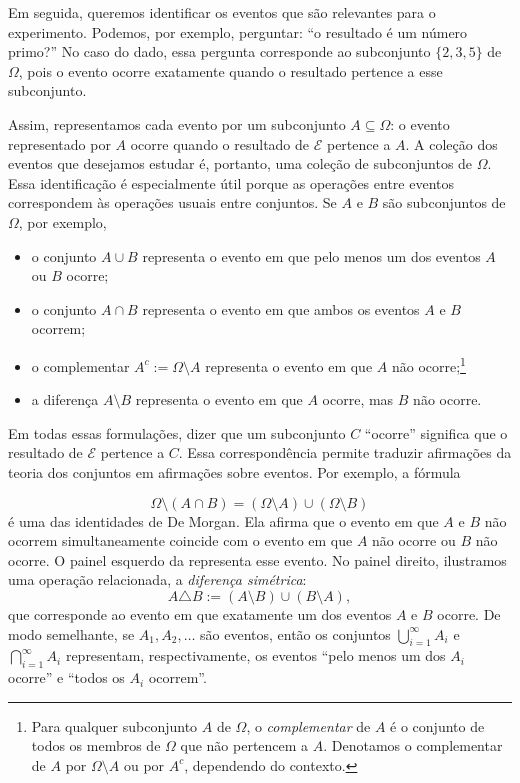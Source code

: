 \documentclass[12pt,portuguese]{article}
\theoremstyle{definition}
\begin{document}
\medskip

Em seguida, queremos identificar os eventos que são relevantes para o
experimento. Podemos, por exemplo, perguntar: ``o resultado é um número
primo?'' No caso do dado, essa pergunta corresponde ao subconjunto
\(\{2, 3, 5\}\) de \(\Omega\), pois o evento ocorre exatamente quando o
resultado pertence a esse subconjunto.

Assim, representamos cada evento por um subconjunto \(A \subseteq \Omega\): o
evento representado por \(A\) ocorre quando o resultado de \(\mathcal{E}\)
pertence a \(A\). A coleção dos eventos que desejamos estudar é, portanto,
uma coleção de subconjuntos de \(\Omega\). Essa identificação é especialmente
útil porque as operações entre eventos correspondem às operações usuais entre
conjuntos. Se \(A\) e \(B\) são subconjuntos de \(\Omega\), por exemplo,
\begin{itemize}
\item o conjunto \(A \cup B\) representa o evento em que pelo menos um dos
eventos \(A\) ou \(B\) ocorre;
\item o conjunto \(A \cap B\) representa o evento em que ambos os eventos
\(A\) e \(B\) ocorrem;
\item o complementar \(A^c := \Omega \setminus A\) representa o evento em
que \(A\) não ocorre;\footnote{Para qualquer subconjunto \(A\) de
\(\Omega\), o \emph{complementar} de \(A\) é o conjunto de todos os
membros de \(\Omega\) que não pertencem a \(A\). Denotamos o
complementar de \(A\) por \(\Omega \setminus A\) ou por \(A^c\),
dependendo do contexto.}
\item a diferença \(A \setminus B\) representa o evento em que \(A\) ocorre,
mas \(B\) não ocorre.
\end{itemize}

Em todas essas formulações, dizer que um subconjunto \(C\) ``ocorre'' significa
que o resultado de \(\mathcal{E}\) pertence a \(C\). Essa correspondência
permite traduzir afirmações da teoria dos conjuntos em afirmações sobre eventos.
Por exemplo, a fórmula

\[
\Omega \setminus (A \cap B) = (\Omega \setminus A) \cup (\Omega \setminus B)
\]
é uma das identidades de De Morgan. Ela afirma que o evento em que \(A\) e
\(B\) não ocorrem simultaneamente coincide com o evento em que \(A\) não
ocorre ou \(B\) não ocorre. O painel esquerdo da
 representa esse evento. No painel direito,
ilustramos uma operação relacionada, a \emph{diferença simétrica}:
\[
A \triangle B := (A \setminus B) \cup (B \setminus A),
\]
que corresponde ao evento em que exatamente um dos eventos \(A\) e \(B\)
ocorre. De modo
semelhante, se \(A_1, A_2, \dots\) são eventos, então os conjuntos
\(\bigcup_{i=1}^{\infty} A_i\) e \(\bigcap_{i=1}^{\infty} A_i\) representam,
respectivamente, os eventos ``pelo menos um dos \(A_i\) ocorre'' e ``todos os
\(A_i\) ocorrem''.
\end{document}

